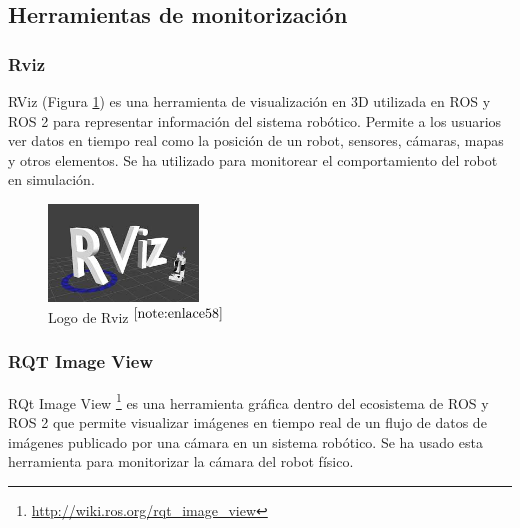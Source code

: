 \setcounter{footnote}{57} %

\subsection{Herramientas de monitorización}

\subsubsection{Rviz}

RViz (Figura \ref{fig:rviz}) es una herramienta de visualización en 3D utilizada en \acs{ROS} y \acs{ROS} 2 para representar información del sistema robótico. Permite a los usuarios ver datos en tiempo real como la posición de un robot, sensores, cámaras, mapas y otros elementos. Se ha utilizado para monitorear el comportamiento del robot en simulación.\\

\begin{figure} [h!]
	\begin{center}
		\includegraphics[width=4cm]{figs/rviz.png}
	\end{center}
	\caption{Logo de Rviz $^{\ref{note:enlace58}}$} 
	\label{fig:rviz}
\end{figure}

\setcounter{footnote}{58} %

\subsubsection{RQT Image View}

RQt Image View \footnote{\url{http://wiki.ros.org/rqt_image_view}} es una herramienta gráfica dentro del ecosistema de \acs{ROS} y \acs{ROS} 2 que permite visualizar imágenes en tiempo real de un flujo de datos de imágenes publicado por una cámara en un sistema robótico. Se ha usado esta herramienta para monitorizar la cámara del robot físico.

